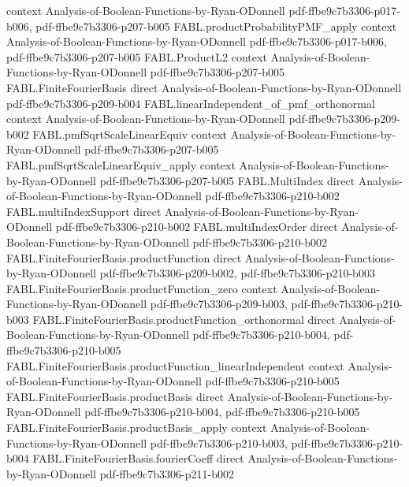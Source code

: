 \begin{theorem}
  {context}
  {Analysis-of-Boolean-Functions-by-Ryan-ODonnell}
  {pdf-ffbe9c7b3306-p017-b006,
    pdf-ffbe9c7b3306-p207-b005}
\proofstep
  {FABL.productProbabilityPMF_apply}
  {context}
  {Analysis-of-Boolean-Functions-by-Ryan-ODonnell}
  {pdf-ffbe9c7b3306-p017-b006,
    pdf-ffbe9c7b3306-p207-b005}
\proofstep
  {FABL.ProductL2}
  {context}
  {Analysis-of-Boolean-Functions-by-Ryan-ODonnell}
  {pdf-ffbe9c7b3306-p207-b005}
\proofstep
  {FABL.FiniteFourierBasis}
  {direct}
  {Analysis-of-Boolean-Functions-by-Ryan-ODonnell}
  {pdf-ffbe9c7b3306-p209-b004}
\proofstep
  {FABL.linearIndependent_of_pmf_orthonormal}
  {context}
  {Analysis-of-Boolean-Functions-by-Ryan-ODonnell}
  {pdf-ffbe9c7b3306-p209-b002}
\proofstep
  {FABL.pmfSqrtScaleLinearEquiv}
  {context}
  {Analysis-of-Boolean-Functions-by-Ryan-ODonnell}
  {pdf-ffbe9c7b3306-p207-b005}
\proofstep
  {FABL.pmfSqrtScaleLinearEquiv_apply}
  {context}
  {Analysis-of-Boolean-Functions-by-Ryan-ODonnell}
  {pdf-ffbe9c7b3306-p207-b005}
\proofstep
  {FABL.MultiIndex}
  {direct}
  {Analysis-of-Boolean-Functions-by-Ryan-ODonnell}
  {pdf-ffbe9c7b3306-p210-b002}
\proofstep
  {FABL.multiIndexSupport}
  {direct}
  {Analysis-of-Boolean-Functions-by-Ryan-ODonnell}
  {pdf-ffbe9c7b3306-p210-b002}
\proofstep
  {FABL.multiIndexOrder}
  {direct}
  {Analysis-of-Boolean-Functions-by-Ryan-ODonnell}
  {pdf-ffbe9c7b3306-p210-b002}
\proofstep
  {FABL.FiniteFourierBasis.productFunction}
  {direct}
  {Analysis-of-Boolean-Functions-by-Ryan-ODonnell}
  {pdf-ffbe9c7b3306-p209-b002,
    pdf-ffbe9c7b3306-p210-b003}
\proofstep
  {FABL.FiniteFourierBasis.productFunction_zero}
  {context}
  {Analysis-of-Boolean-Functions-by-Ryan-ODonnell}
  {pdf-ffbe9c7b3306-p209-b003,
    pdf-ffbe9c7b3306-p210-b003}
\proofstep
  {FABL.FiniteFourierBasis.productFunction_orthonormal}
  {direct}
  {Analysis-of-Boolean-Functions-by-Ryan-ODonnell}
  {pdf-ffbe9c7b3306-p210-b004,
    pdf-ffbe9c7b3306-p210-b005}
\proofstep
  {FABL.FiniteFourierBasis.productFunction_linearIndependent}
  {context}
  {Analysis-of-Boolean-Functions-by-Ryan-ODonnell}
  {pdf-ffbe9c7b3306-p210-b005}
\proofstep
  {FABL.FiniteFourierBasis.productBasis}
  {direct}
  {Analysis-of-Boolean-Functions-by-Ryan-ODonnell}
  {pdf-ffbe9c7b3306-p210-b004,
    pdf-ffbe9c7b3306-p210-b005}
\proofstep
  {FABL.FiniteFourierBasis.productBasis_apply}
  {context}
  {Analysis-of-Boolean-Functions-by-Ryan-ODonnell}
  {pdf-ffbe9c7b3306-p210-b003,
    pdf-ffbe9c7b3306-p210-b004}
\proofstep
  {FABL.FiniteFourierBasis.fourierCoeff}
  {direct}
  {Analysis-of-Boolean-Functions-by-Ryan-ODonnell}
  {pdf-ffbe9c7b3306-p211-b002}

\end{theorem}
